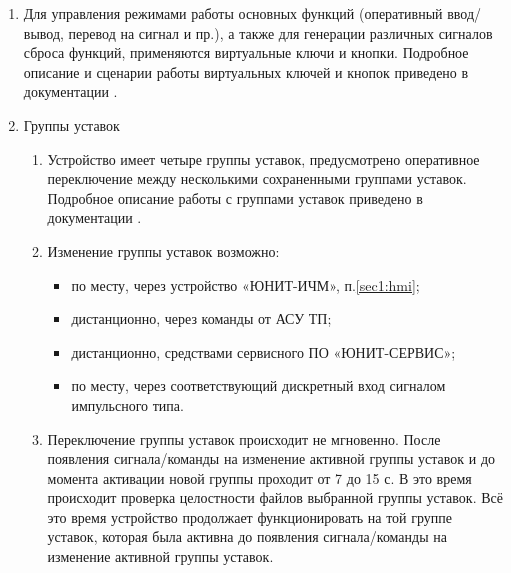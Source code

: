 \begin{enumerate}[label=\arabic{section}.\arabic{subsection}.\arabic*, labelsep=4pt, leftmargin=0pt, itemindent=57pt]
\item
Для управления режимами работы основных функций (оперативный ввод/вывод, перевод на сигнал и пр.), а также для генерации различных сигналов сброса функций, применяются виртуальные ключи и кнопки.
Подробное описание и сценарии работы виртуальных ключей и кнопок приведено в документации \ManualUnitGeneral. 

\item Группы уставок
\begin{enumerate}[label=\arabic{section}.\arabic{subsection}.\arabic{enumi}.\arabic*, labelsep=4pt, leftmargin=0em, itemindent=65pt, parsep=0pt]

\item Устройство имеет четыре группы уставок, предусмотрено оперативное переключение между несколькими сохраненными группами уставок. Подробное описание работы с группами уставок приведено в документации \ManualUnitGeneral.

\item
Изменение группы уставок возможно:
\begin{itemize}
    \item по месту, через устройство «ЮНИТ-ИЧМ», п.\ref{sec1:hmi};
    \item дистанционно, через команды от АСУ ТП;
    \item дистанционно, средствами сервисного ПО «ЮНИТ-СЕРВИС»;
    \item по месту, через соответствующий дискретный вход сигналом импульсного типа.
\end{itemize}

\item
Переключение группы уставок происходит не мгновенно.
После появления сигнала/команды на изменение активной группы уставок и до момента активации новой группы проходит от 7 до 15 с.
В это время происходит проверка целостности файлов выбранной группы уставок.
Всё это время устройство продолжает функционировать на той группе уставок, которая была активна до появления сигнала/команды на изменение активной группы уставок.

\end{enumerate}


\end{enumerate}
